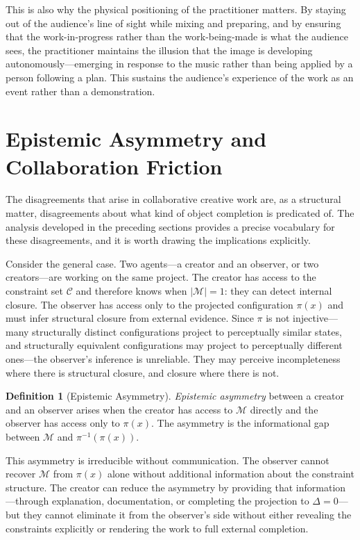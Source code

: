 \documentclass[12pt, twoside]{article}
\theoremstyle{plain}
\theoremstyle{definition}
\newtheorem{definition}[theorem]{Definition}
\theoremstyle{remark}
\begin{document}
This is also why the physical positioning of the practitioner matters. By staying out of the audience's line of sight while mixing and preparing, and by ensuring that the work-in-progress rather than the work-being-made is what the audience sees, the practitioner maintains the illusion that the image is developing autonomously---emerging in response to the music rather than being applied by a person following a plan. This sustains the audience's experience of the work as an event rather than a demonstration.

\section{Epistemic Asymmetry and Collaboration Friction}
\label{sec:asymmetry}

The disagreements that arise in collaborative creative work are, as a structural matter, disagreements about what kind of object completion is predicated of. The analysis developed in the preceding sections provides a precise vocabulary for these disagreements, and it is worth drawing the implications explicitly.

Consider the general case. Two agents---a creator and an observer, or two creators---are working on the same project. The creator has access to the constraint set $\mathcal{C}$ and therefore knows when $|\mathcal{M}| = 1$: they can detect internal closure. The observer has access only to the projected configuration $\pi(x)$ and must infer structural closure from external evidence. Since $\pi$ is not injective---many structurally distinct configurations project to perceptually similar states, and structurally equivalent configurations may project to perceptually different ones---the observer's inference is unreliable. They may perceive incompleteness where there is structural closure, and closure where there is not.

\begin{definition}[Epistemic Asymmetry]
\emph{Epistemic asymmetry} between a creator and an observer arises when the creator has access to $\mathcal{M}$ directly and the observer has access only to $\pi(x)$. The asymmetry is the informational gap between $\mathcal{M}$ and $\pi^{-1}(\pi(x))$.
\end{definition}

This asymmetry is irreducible without communication. The observer cannot recover $\mathcal{M}$ from $\pi(x)$ alone without additional information about the constraint structure. The creator can reduce the asymmetry by providing that information---through explanation, documentation, or completing the projection to $\Delta = 0$---but they cannot eliminate it from the observer's side without either revealing the constraints explicitly or rendering the work to full external completion.
\end{document}
